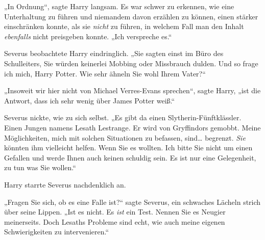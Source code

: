 „In Ordnung“, sagte Harry langsam. Es war schwer zu erkennen, wie eine Unterhaltung zu führen und niemandem davon erzählen zu können, einen stärker einschränken konnte, als sie \emph{nicht} zu führen, in welchem Fall man den Inhalt \emph{ebenfalls} nicht preisgeben konnte. „Ich verspreche es.“

Severus beobachtete Harry eindringlich. „Sie sagten einst im Büro des Schulleiters, Sie würden keinerlei Mobbing oder Missbrauch dulden. Und so frage ich mich, Harry Potter. Wie sehr ähneln Sie wohl Ihrem Vater?“

„Insoweit wir hier nicht von Michael Verres-Evans sprechen“, sagte Harry, „ist die Antwort, dass ich sehr wenig über James Potter weiß.“

Severus nickte, wie zu sich selbst. „Es gibt da einen Slytherin-Fünftklässler. Einen Jungen namens Lesath Lestrange. Er wird von Gryffindors gemobbt. Meine Möglichkeiten, mich mit solchen Situationen zu befassen, sind… begrenzt. \emph{Sie} könnten ihm vielleicht helfen. Wenn Sie es wollten. Ich bitte Sie nicht um einen Gefallen und werde Ihnen auch keinen schuldig sein. Es ist nur eine Gelegenheit, zu tun was Sie wollen.“

Harry starrte Severus nachdenklich an.

„Fragen Sie sich, ob es eine Falle ist?“ sagte Severus, ein schwaches Lächeln strich über seine Lippen. „Ist es nicht. Es \emph{ist} ein Test. Nennen Sie es Neugier meinerseits. Doch Lesaths Probleme sind echt, wie auch meine eigenen Schwierigkeiten zu intervenieren.“

